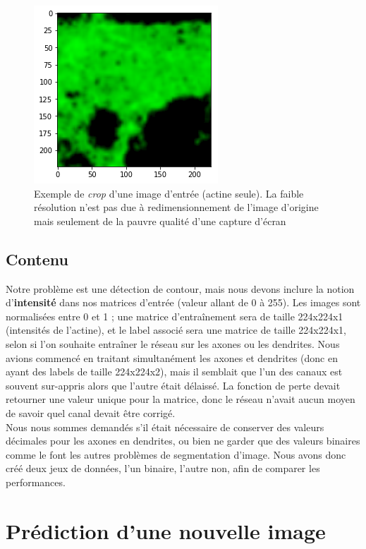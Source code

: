 \documentclass{report}
\begin{document}
\begin{figure}[H]
\centering
\includegraphics[scale=0.35]{"ex_crop"}
\caption{Exemple de \textit{crop} d'une image d'entrée (actine seule). La faible
résolution n'est pas due à redimensionnement de l'image d'origine mais
seulement de la pauvre qualité d'une capture d'écran}
\end{figure}

\subsection{Contenu}

Notre problème est une détection de contour, mais nous devons inclure la notion
d'\textbf{intensité} dans nos matrices d'entrée (valeur allant de 0 à 255).
Les images sont normalisées entre 0 et 1 ; une matrice d'entraînement sera de
taille 224x224x1 (intensités de l'actine), et le label associé sera une matrice
de taille 224x224x1, selon si l'on souhaite entraîner le réseau sur les axones
ou les dendrites. Nous avions commencé en traitant simultanément les axones et
dendrites (donc en ayant des labels de taille 224x224x2), mais il semblait
que l'un des canaux est souvent sur-appris alors que l'autre était délaissé.
La fonction de perte devait retourner une valeur unique pour la matrice, donc
le réseau n'avait aucun moyen de savoir quel canal devait être corrigé. \\
Nous nous sommes demandés s'il était nécessaire de conserver des valeurs décimales
pour les axones en dendrites, ou bien ne garder que des valeurs binaires comme le
font les autres problèmes de segmentation d'image. Nous avons donc créé deux jeux
de données, l'un binaire, l'autre non, afin de comparer les performances.

\section{Prédiction d'une nouvelle image}
\end{document}
